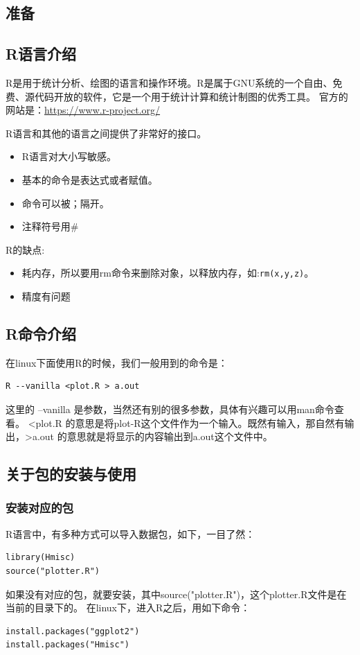 \documentclass[a4paper,12pt]{ctexbook}
\begin{document}
\begin{flushleft}

\chapter{准备}
\section{R语言介绍~\cite{R}}
R是用于统计分析、绘图的语言和操作环境。R是属于GNU系统的一个自由、免费、源代码开放的软件，它是一个用于统计计算和统计制图的优秀工具。
官方的网站是：\url{https://www.r-project.org/}

R语言和其他的语言之间提供了非常好的接口。
\begin{itemize}
  \item R语言对大小写敏感。
  \item 基本的命令是表达式或者赋值。
  \item 命令可以被；隔开。
  \item 注释符号用\#
\end{itemize}

R的缺点:
\begin{itemize}
  \item 耗内存，所以要用rm命令来删除对象，以释放内存，如:\verb|rm(x,y,z)|。
  \item 精度有问题
\end{itemize}

\section{R命令介绍}
在linux下面使用R的时候，我们一般用到的命令是：
\begin{verbatim}
R --vanilla <plot.R > a.out
\end{verbatim}
这里的 --vanilla 是参数，当然还有别的很多参数，具体有兴趣可以用man命令查看。
<plot.R 的意思是将plot-R这个文件作为一个输入。既然有输入，那自然有输出，>a.out 的意思就是将显示的内容输出到a.out这个文件中。

\section{关于包的安装与使用}
\subsection{安装对应的包}
\label{install_package}
R语言中，有多种方式可以导入数据包，如下，一目了然：
\begin{verbatim}
library(Hmisc)
source("plotter.R")
\end{verbatim}
如果没有对应的包，就要安装，其中source("plotter.R")，这个plotter.R文件是在当前的目录下的。
在linux下，进入R之后，用如下命令：
\begin{verbatim}
install.packages("ggplot2")
install.packages("Hmisc")
\end{verbatim}

\end{flushleft}
\end{document}
